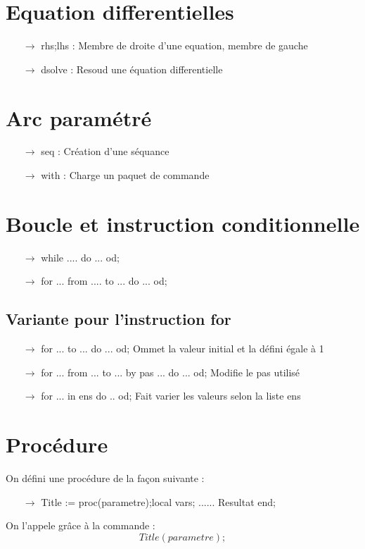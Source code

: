 \documentclass[a4paper,10pt,twocolumn]{report}
\begin{document}
\section{Equation differentielles}
\begin{itemize}
 \item[$\rightarrow$] rhs;lhs : Membre de droite d'une equation, membre de gauche
\item[$\rightarrow$] dsolve : Resoud une équation differentielle
\end{itemize}
\section{Arc paramétré}
\begin{itemize}
 \item[$\rightarrow$] seq : Création d'une séquance
\item[$\rightarrow$] with : Charge un paquet de commande
\end{itemize}
\section{Boucle et instruction conditionnelle}
\begin{itemize}
 \item[$\rightarrow$] while .... do ... od; 
\item[$\rightarrow$] for ... from .... to ... do ... od;
\end{itemize}
\subsection{Variante pour l'instruction for}
\begin{itemize}
\item[$\rightarrow$] for ... to ... do ... od; Ommet la valeur initial et la défini égale à 1
\item[$\rightarrow$] for ... from ... to ... by pas ... do ... od; Modifie le pas utilisé
\item[$\rightarrow$] for ... in ens do .. od; Fait varier les valeurs selon la liste ens
\end{itemize}
\section{Procédure}
On défini une procédure de la façon suivante :
\begin{itemize}
 \item[$\rightarrow$] Title := proc(parametre);local vars; ...... Resultat end;
\end{itemize}
On l'appele grâce à la commande :
$$Title(parametre);$$
\end{document}
